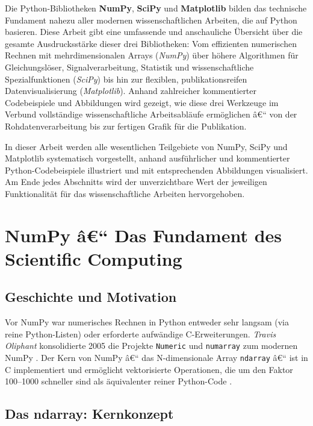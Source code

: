 \documentclass[12pt, a4paper]{article}
\begin{document}
Die Python-Bibliotheken \textbf{NumPy}, \textbf{SciPy} und \textbf{Matplotlib}
bilden das technische Fundament nahezu aller modernen wissenschaftlichen
Arbeiten, die auf Python basieren. Diese Arbeit gibt eine umfassende und
anschauliche Übersicht über die gesamte Ausdrucksstärke dieser drei
Bibliotheken: Vom effizienten numerischen Rechnen mit mehrdimensionalen
Arrays (\emph{NumPy}) über höhere Algorithmen für Gleichungslöser,
Signalverarbeitung, Statistik und wissenschaftliche Spezialfunktionen
(\emph{SciPy}) bis hin zur flexiblen, publikationsreifen
Datenvisualisierung (\emph{Matplotlib}). Anhand zahlreicher kommentierter
Codebeispiele und Abbildungen wird gezeigt, wie diese drei Werkzeuge im
Verbund vollständige wissenschaftliche Arbeitsabläufe ermöglichen â€“
von der Rohdatenverarbeitung bis zur fertigen Grafik für die Publikation.

In dieser Arbeit werden alle wesentlichen Teilgebiete von NumPy, SciPy und
Matplotlib systematisch vorgestellt, anhand ausführlicher und kommentierter
Python-Codebeispiele illustriert und mit entsprechenden Abbildungen
visualisiert. Am Ende jedes Abschnitts wird der unverzichtbare Wert der
jeweiligen Funktionalität für das wissenschaftliche Arbeiten hervorgehoben.


\section{NumPy â€“ Das Fundament des Scientific Computing}
\label{sec:numpy}

\subsection{Geschichte und Motivation}
\label{subsec:numpy-history}

Vor NumPy war numerisches Rechnen in Python entweder sehr langsam (via
reine Python-Listen) oder erforderte aufwändige C-Erweiterungen.
\emph{Travis Oliphant} konsolidierte 2005 die Projekte \texttt{Numeric}
und \texttt{numarray} zum modernen NumPy \cite{oliphant2006guide}.
Der Kern von NumPy â€“ das N-dimensionale Array \texttt{ndarray} â€“ ist in
C implementiert und ermöglicht vektorisierte Operationen, die um den
Faktor 100--1000 schneller sind als äquivalenter reiner Python-Code
\cite{harris2020array}.

\subsection{Das ndarray: Kernkonzept}
\label{subsec:numpy-ndarray}
\end{document}
